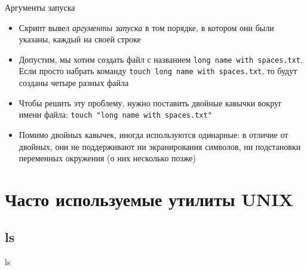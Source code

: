 \documentclass{beamer}
\begin{document}
\begin{frame}{Аргументы запуска}
	\begin{itemize}
		\item{Скрипт вывел \emph{аргументы запуска} в том порядке, в котором они были указаны, каждый на своей строке}%
		\item{Допустим, мы хотим создать файл с названием \texttt{long name with spaces.txt}. Если просто набрать команду \texttt{touch~long~name~with~spaces.txt}, то будут созданы четыре разных файла}%
		\item{Чтобы решить эту проблему, нужно поставить двойные кавычки вокруг имени файла: \texttt{touch~"long~name~with~spaces.txt"}}%
		\item{Помимо двойных кавычек, иногда используются одинарные: в отличие от двойных, они не поддерживают ни экранирования символов, ни подстановки переменных окружения (о них несколько позже)} 
	\end{itemize}
\end{frame}

\section{Часто используемые утилиты UNIX}

\subsection{ls}
\begin{frame}{\ttfamily ls}
\end{frame}
\end{document}
